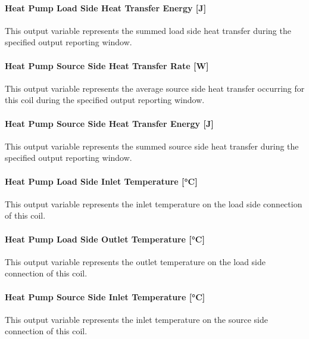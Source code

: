 \paragraph{Heat Pump Load Side Heat Transfer Energy {[}J{]}}\label{plhp_eir_outputs_q_load_sum}

This output variable represents the summed load side heat transfer during the specified output reporting window.

\paragraph{Heat Pump Source Side Heat Transfer Rate {[}W{]}}\label{plhp_eir_outputs_q_source}

This output variable represents the average source side heat transfer occurring for this coil during the specified output reporting window.

\paragraph{Heat Pump Source Side Heat Transfer Energy {[}J{]}}\label{plhp_eir_outputs_q_src_sum}

This output variable represents the summed source side heat transfer during the specified output reporting window.

\paragraph{Heat Pump Load Side Inlet Temperature {[}°C{]}}\label{plhp_eir_outputs_t_load_in}

This output variable represents the inlet temperature on the load side connection of this coil.

\paragraph{Heat Pump Load Side Outlet Temperature {[}°C{]}}\label{plhp_eir_outputs_t_load_out}

This output variable represents the outlet temperature on the load side connection of this coil.

\paragraph{Heat Pump Source Side Inlet Temperature {[}°C{]}}\label{plhp_eir_outputs_t_source_in}

This output variable represents the inlet temperature on the source side connection of this coil.


